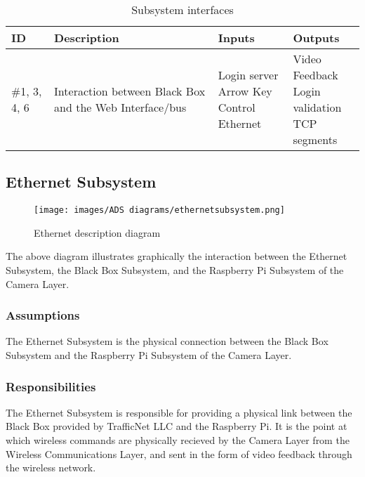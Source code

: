 \begin {table}[H]
\caption {Subsystem interfaces} 
\begin{center}
    \begin{tabular}{ | p{1cm} | p{6cm} | p{3cm} | p{3cm} |}
    \hline
    ID & Description & Inputs & Outputs \\ \hline
    \#1, 3, 4, 6 & Interaction between Black Box and the Web Interface/bus & \pbox{3cm}{Login server \\ Arrow Key Control \\ Ethernet} & \pbox{3cm}{Video Feedback \\ Login validation \\ TCP segments}  \\ \hline
    \end{tabular}
\end{center}
\end{table}

\subsection{Ethernet Subsystem}

\begin{figure}[h!]
	\centering
 	\texttt{[image: images/ADS diagrams/ethernetsubsystem.png]}
 \caption{Ethernet description diagram}
\end{figure}

The above diagram illustrates graphically the interaction between the Ethernet Subsystem, the Black Box Subsystem, and the Raspberry Pi Subsystem of the Camera Layer. 

\subsubsection{Assumptions}
The Ethernet Subsystem is the physical connection between the Black Box Subsystem and the Raspberry Pi Subsystem of the Camera Layer.

\subsubsection{Responsibilities}
The Ethernet Subsystem is responsible for providing a physical link between the Black Box provided by TrafficNet LLC and the Raspberry Pi. It is the point at which wireless commands are physically recieved by the Camera Layer from the Wireless Communications Layer, and sent in the form of video feedback through the wireless network.

